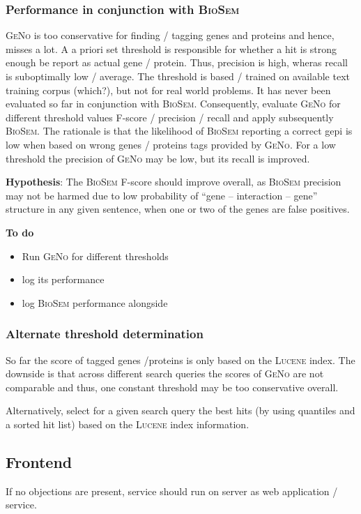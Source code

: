 \documentclass[a4paper,10pt]{article}
\begin{document}
  \subsubsection{Performance in conjunction with \textsc{BioSem}}
\textsc{GeNo} is too conservative for finding / tagging genes and proteins and hence, misses a lot. A a priori set threshold is responsible for whether a hit is strong enough be report as actual gene / protein. Thus, precision is high, wheras recall is suboptimally low / average. The threshold is based / trained on available text training corpus (which?), but not for real world problems. It has never been evaluated so far in conjunction with \textsc{BioSem}. Consequently, evaluate \textsc{GeNo} for different threshold values F-score / precision / recall and apply subsequently \textsc{BioSem}. The rationale is that the likelihood of \textsc{BioSem} reporting a correct gepi is low when based on wrong genes / proteins tags provided by \textsc{GeNo}. For a low threshold the precision of \textsc{GeNo} may be low, but its recall is improved. 

\textbf{Hypothesis}: The \textsc{BioSem} F-score should improve overall, as \textsc{BioSem} precision may not be harmed due to low probability of ``gene -- interaction -- gene'' structure in any given sentence, when one or two of the genes are false positives.

\newpage
\textbf{To do}
\begin{itemize}
 \item Run \textsc{GeNo} for different thresholds
 \item log its performance
 \item log \textsc{BioSem} performance alongside
\end{itemize}

\subsubsection{Alternate threshold determination}
    
So far the score of tagged genes /proteins is only based on the \textsc{Lucene} index. The downside is that across different search queries the scores of \textsc{GeNo} are not comparable and thus, one constant threshold may be too conservative overall.

Alternatively, select for a given search query the best hits (by using quantiles and a sorted hit list) based on the \textsc{Lucene} index information.

\subsection{Frontend}
If no objections are present, service should run on server as web application / service.
\end{document}
